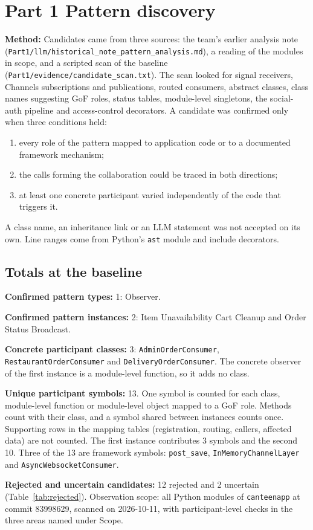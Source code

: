 \documentclass[11pt,a4paper]{article}
\newcommand{\entry}[1]{\par\textbf{#1:} }
\newcommand{\code}[1]{\nolinkurl{#1}}
\begin{document}
\section{Part 1 Pattern discovery}
\entry{Method}Candidates came from three sources: the team's earlier analysis note (\code{Part1/llm/historical_note_pattern_analysis.md}), a reading of the modules in scope, and a scripted scan of the baseline (\code{Part1/evidence/candidate_scan.txt}). The scan looked for signal receivers, Channels subscriptions and publications, routed consumers, abstract classes, class names suggesting GoF roles, status tables, module-level singletons, the social-auth pipeline and access-control decorators. A candidate was confirmed only when three conditions held:
\begin{enumerate}
\item every role of the pattern mapped to application code or to a documented framework mechanism;
\item the calls forming the collaboration could be traced in both directions;
\item at least one concrete participant varied independently of the code that triggers it.
\end{enumerate}
A class name, an inheritance link or an LLM statement was not accepted on its own. Line ranges come from Python's \code{ast} module and include decorators.

\subsection{Totals at the baseline}
\entry{Confirmed pattern types}1: Observer.
\entry{Confirmed pattern instances}2: Item Unavailability Cart Cleanup and Order Status Broadcast.
\entry{Concrete participant classes}3: \code{AdminOrderConsumer}, \code{RestaurantOrderConsumer} and \code{DeliveryOrderConsumer}. The concrete observer of the first instance is a module-level function, so it adds no class.
\entry{Unique participant symbols}13. One symbol is counted for each class, module-level function or module-level object mapped to a GoF role. Methods count with their class, and a symbol shared between instances counts once. Supporting rows in the mapping tables (registration, routing, callers, affected data) are not counted. The first instance contributes 3 symbols and the second 10. Three of the 13 are framework symbols: \code{post_save}, \code{InMemoryChannelLayer} and \code{AsyncWebsocketConsumer}.
\entry{Rejected and uncertain candidates}12 rejected and 2 uncertain (Table~\ref{tab:rejected}). Observation scope: all Python modules of \code{canteenapp} at commit 83998629, scanned on 2026-10-11, with participant-level checks in the three areas named under Scope.
\end{document}
